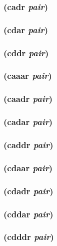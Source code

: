 \documentclass{article}
\begin{document}
\subsubsection{(cadr \emph{pair})}

\subsubsection{(cdar \emph{pair})}

\subsubsection{(cddr \emph{pair})}

\subsubsection{(caaar \emph{pair})}

\subsubsection{(caadr \emph{pair})}

\subsubsection{(cadar \emph{pair})}

\subsubsection{(caddr \emph{pair})}

\subsubsection{(cdaar \emph{pair})}

\subsubsection{(cdadr \emph{pair})}

\subsubsection{(cddar \emph{pair})}

\subsubsection{(cdddr \emph{pair})}
\end{document}
